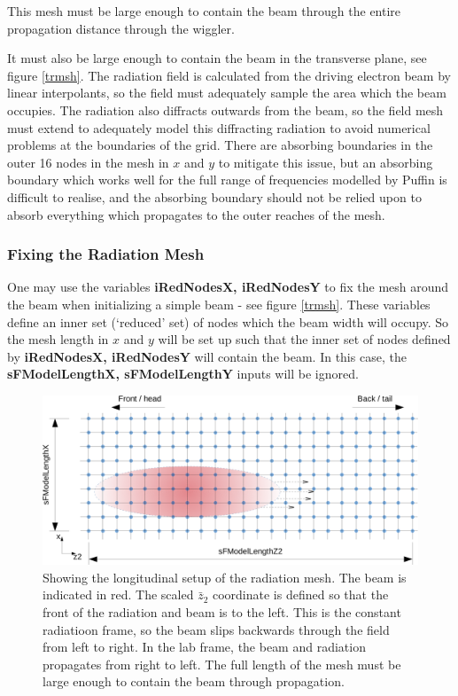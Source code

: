 \documentclass[12pt]{article}%
\begin{document}
This mesh must be large enough to contain the beam through the entire propagation distance through the wiggler.

It must also be large enough to contain the beam in the transverse plane, see figure \ref{trmsh}. The radiation field is calculated from the driving electron beam by linear interpolants, so the field must adequately sample the area which the beam occupies.  The radiation also diffracts outwards from the beam, so the field mesh must extend to adequately model this diffracting radiation to avoid numerical problems at the boundaries of the grid. There are absorbing boundaries in the outer 16 nodes in the mesh in $x$ and $y$ to mitigate this issue, but an absorbing boundary which works well for the full range of frequencies modelled by Puffin is difficult to realise, and the absorbing boundary should not be relied upon to absorb everything which propagates to the outer reaches of the mesh.

\subsubsection{Fixing the Radiation Mesh}

One may use the variables {\bf iRedNodesX, iRedNodesY} to fix the mesh around the beam when initializing a simple beam - see figure \ref{trmsh}. These variables define an inner set (`reduced' set) of nodes which the beam width will occupy. So the mesh length in $x$ and $y$ will be set up such that the inner set of nodes defined by  {\bf iRedNodesX, iRedNodesY} will contain the beam. In this case, the {\bf sFModelLengthX, sFModelLengthY} inputs will be ignored.


\begin{figure}
\centering
\includegraphics[width=150mm]{long_mesh.png}
\caption{Showing the longitudinal setup of the radiation mesh. The beam is indicated in red. The scaled $\bar{z}_2$ coordinate is defined so that the front of the radiation and beam is to the left. This is the constant radiatioon frame, so the beam slips backwards through the field from left to right. In the lab frame, the beam and radiation propagates from right to left. The full length of the mesh must be large enough to contain the beam through propagation.}
\label{lgmsh}
\end{figure}
\end{document}
